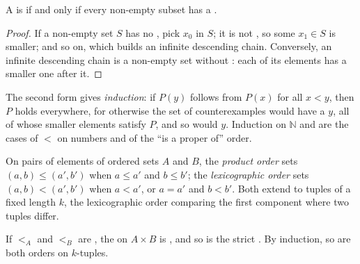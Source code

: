 \begin{proposition}\label{prop:b1:induction-and-termination:minimal}
A  is  if and only if every non-empty subset has a .
\end{proposition}

\begin{proof}
If a non-empty set $S$ has no , pick $x_0$ in $S$; it is not , so some $x_1 \in S$ is smaller;
and so on, which builds an infinite descending chain. Conversely, an infinite descending chain is a non-empty set
without : each of its elements has a smaller one after it.
\end{proof}

The second form gives \emph{ induction}: if $P(y)$ follows from $P(x)$ for all $x < y$, then $P$ holds
everywhere, for otherwise the set of counterexamples would have a  $y$, all of whose smaller elements
satisfy $P$, and so would $y$. Induction on $\mathbb{N}$ and  are the cases of $<$ on numbers and
of the ``is a proper  of'' order.

\begin{definition}\label{def:b1:induction-and-termination:lex}
On pairs of elements of ordered sets $A$ and $B$, the \emph{product order} sets $(a, b) \leq (a',
b')$ when $a \leq a'$ and $b \leq b'$; the \emph{lexicographic order} sets $(a, b) < (a', b')$
when $a < a'$, or $a = a'$ and $b < b'$. Both extend to tuples of a fixed length $k$, the lexicographic order comparing
the first component where two tuples differ.
\end{definition}

\begin{proposition}\label{prop:b1:induction-and-termination:lex}
If $<_A$ and $<_B$ are , the  on $A \times B$ is , and so is the strict
. By induction, so are both orders on $k$-tuples.
\end{proposition}

